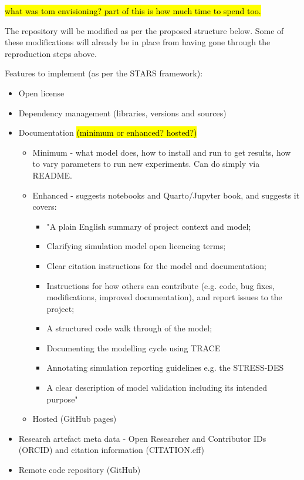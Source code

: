 \hl{what was tom envisioning? part of this is how much time to spend too.}

The repository will be modified as per the proposed structure below. Some of these modifications will already be in place from having gone through the reproduction steps above.

Features to implement (as per the STARS framework):
\begin{itemize}
    \item Open license
    \item Dependency management (libraries, versions and sources)
    \item Documentation \hl{(minimum or enhanced? hosted?)}
    \begin{itemize}
        \item Minimum - what model does, how to install and run to get results, how to vary parameters to run new experiments. Can do simply via README.
        \item Enhanced - suggests notebooks and Quarto/Jupyter book, and suggests it covers:
        \begin{itemize}
            \item "A plain English summary of project context and model;
            \item Clarifying simulation model open licencing terms;
            \item Clear citation instructions for the model and documentation;
            \item Instructions for how others can contribute (e.g. code, bug fixes, modifications, improved documentation), and report issues to the project;
            \item A structured code walk through of the model;
            \item Documenting the modelling cycle using TRACE\autocite{ayllon_keeping_2021}
            \item Annotating simulation reporting guidelines  e.g. the STRESS-DES
            \item A clear description of model validation including its intended purpose"
        \end{itemize}
        \item Hosted (GitHub pages)
    \end{itemize}
    \item Research artefact meta data - Open Researcher and Contributor IDs (ORCID) and citation information (CITATION.cff)
    \item Remote code repository (GitHub)

\end{itemize}
